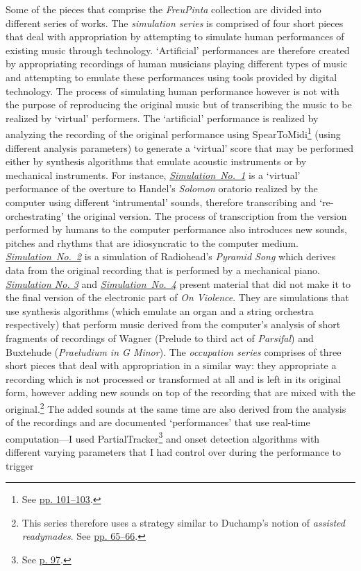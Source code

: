 Some of the pieces that comprise the \emph{FreuPinta} collection are divided into different series of works. The \emph{simulation series} is comprised of four short pieces that deal with appropriation by attempting to simulate human performances of existing music through technology. `Artificial' performances are therefore created by appropriating recordings of human musicians playing different types of music and attempting to emulate these performances using tools provided by digital technology. The process of simulating human performance however is not with the purpose of reproducing the original music but of transcribing the music to be realized by `virtual' performers. The `artificial' performance is realized by analyzing the recording of the original performance using SpearToMidi\footnote{See \hyperlink{spearmidi}{pp. 101--103}.} (using different analysis parameters) to generate a `virtual' score that may be performed either by synthesis algorithms that emulate acoustic instruments or by mechanical instruments. For instance, \href{http://www.federicoreuben.com/media/audio/mp3/Sporcizia_Accademica/contents/01%20Simulation%20No.1.mp3}{\mbox{\emph{Simulation No. 1}}} is a `virtual' performance of the overture to Handel's \emph{Solomon} oratorio realized by the computer using different `intrumental' sounds, therefore transcribing and `re-orchestrating' the original version. The process of transcription from the version performed by humans to the computer performance also introduces new sounds, pitches and rhythms that are idiosyncratic to the computer medium. \href{http://www.federicoreuben.com/media/audio/mp3/Sporcizia_Accademica/contents/02%20Simulation%20No.2.mp3}{\mbox{\emph{Simulation No. 2}}} is a simulation of Radiohead's \emph{Pyramid Song} which derives data from the original recording that is performed by a mechanical piano. \href{http://www.federicoreuben.com/media/audio/mp3/Sporcizia_Accademica/contents/03%20Simulation%20No.3.mp3}{\emph{Simulation No. 3}} and \href{http://www.federicoreuben.com/media/audio/mp3/Sporcizia_Accademica/contents/04%20Simulation%20No.4.mp3}{\mbox{\emph{Simulation No. 4}}} present material that did not make it to the final version of the electronic part of \emph{On Violence}. They are simulations that use synthesis algorithms (which emulate an organ and a string orchestra respectively) that perform music derived from the computer's analysis of short fragments of recordings of Wagner (Prelude to third act of \emph{Parsifal}) and Buxtehude (\emph{Praeludium in G Minor}). The \emph{occupation series} comprises of three short pieces that deal with appropriation in a similar way: they appropriate a recording which is not processed or transformed at all and is left in its original form, however adding new sounds on top of the recording that are mixed with the original.\footnote{This series therefore uses a strategy similar to Duchamp's notion of \emph{assisted readymades}. See \hyperlink{lhooq}{pp. 65--66}.} The added sounds at the same time are also derived from the analysis of the recordings and are documented `performances' that use real-time computation---I used PartialTracker\footnote{See \hyperlink{partrack}{p. 97}.} and onset detection algorithms with different varying parameters that I had control over during the performance to trigger 